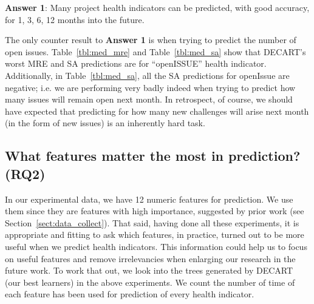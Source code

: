 \documentclass[sigconf,review,anonymous]{acmart}
\begin{document}
  
\begin{blockquote}
\noindent
\textbf{Answer 1}: Many project health indicators can be predicted, with good accuracy, for 1, 3, 6, 12   months into the future.
\end{blockquote}

The only counter result to {\bf Answer 1} is when trying to  predict  the number of open 
issues.
Table~\ref{tbl:med_mre} and 
Table~\ref{tbl:med_sa} show that 
DECART's worst MRE and SA predictions are for ``openISSUE'' health indicator.
Additionally, in  Table~\ref{tbl:med_sa}, all the SA predictions for openIssue are negative; i.e.   we are performing very badly indeed when trying to predict how many issues will remain open next month. In retrospect, of course, we should have expected that predicting for how many new challenges will arise next month (in the form of new issues) is an inherently hard task. 



\subsection{What features matter the most in prediction? (RQ2)}
In our experimental data, we have 12 numeric features for prediction.
We use them since they are features with high importance, suggested by prior work (see Section~\ref{sect:data_collect}).
That said, having done all these experiments, it is appropriate and fitting to ask which features, in practice, turned out to be more useful when we predict health indicators.   This information could help us to focus on useful features and remove irrelevancies when enlarging our research in the future work. To work that out, we look into the trees generated by DECART
(our best learners) in the above experiments.   We count the number of time of each feature has been used for prediction of every health indicator. 
\end{document}
